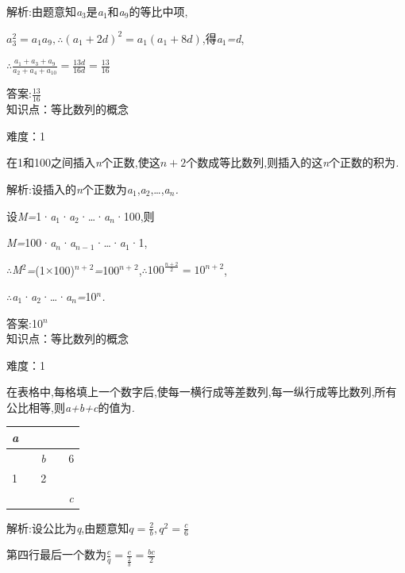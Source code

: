 \documentclass{article} %
\begin{document}
 解析:由题意知\textit{a}${}_{3}$是\textit{a}${}_{1}$和\textit{a}${}_{9}$的等比中项,

$a_3^2=a_1a_9, \therefore (a_1+2d)^2=a_1(a_1+8d)$,得\textit{a}${}_{1}$\textit{=d},

$\therefore \frac{a_1+a_3+a_9}{a_2+a_4+a_{10}}=\frac{13d}{16d}=\frac{13}{16}$

 答案:$\frac{13}{16}$ \\

知识点：等比数列的概念

难度：1

 在1和100之间插入\textit{n}个正数,使这$n+2$个数成等比数列,则插入的这\textit{n}个正数的积为\textit{\underbar{　　　　　}.~}

 解析:设插入的\textit{n}个正数为\textit{a}${}_{1}$,\textit{a}${}_{2}$,{\dots},\textit{a${}_{n}$.}

设\textit{M=}1·\textit{a}${}_{1}$·\textit{a}${}_{2}$·{\dots}·\textit{a${}_{n}$}·100,则

\textit{M=}100·\textit{a${}_{n}$}·\textit{a${}_{n-}$}${}_{1}$·{\dots}·\textit{a}${}_{1}$·1,

\textit{$\therefore$M}${}^{2}$\textit{=}(1\textit{$\times$}100)\textit{${}^{n+}$}${}^{2}$\textit{=}100\textit{${}^{n+}$}${}^{2}$,$\therefore 100^{\frac{n+2}{2}}=10^{n+2}$,

\textit{$\therefore$a}${}_{1}$·\textit{a}${}_{2}$·{\dots}·\textit{a${}_{n}$=}10\textit{${}^{n}$.}

 答案:10\textit{${}^{n}$} \\

知识点：等比数列的概念

难度：1

 在表格中,每格填上一个数字后,使每一横行成等差数列,每一纵行成等比数列,所有公比相等,则\textit{a+b+c}的值为\textit{\underbar{　　　　　}.~}

\begin{tabular}{|p{0.7in}|p{0.1in}|p{0.7in}|p{0.1in}|p{0.8in}|} \hline 
\textit{a} &  &  &  &  \\ \hline 
 &  & \textit{b} &  & 6 \\ \hline 
1 &  & 2 &  &  \\ \hline 
 &  &  &  & \textit{c} \\ \hline 
\end{tabular}

 

 解析:设公比为\textit{q},由题意知$q=\frac{2}{b},q^2=\frac{c}{6}$

第四行最后一个数为$\frac{c}{q}=\frac{c}{\frac{2}{b}}=\frac{bc}{2}$
\end{document}
